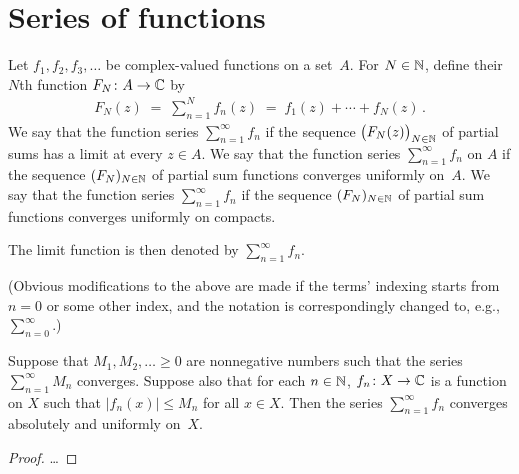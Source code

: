 \section{Series of functions}

\begin{definition}
  \label{def:function_series}
  Let $f_1, f_2, f_3, \ldots$ be complex-valued functions on a set~$A$.
  For $N \in \mathbb{N}$,
  define their $N$th  function $F_N \colon A \to \mathbb{C}$ by
  \begin{align*}
    F_N(z) \; = \; \sum_{n=1}^N f_n(z) \; = \; f_1(z) + \cdots + f_N(z) \, .
  \end{align*}
  We say that the function series $\sum_{n=1}^\infty f_n$
  if the sequence $\big(F_N(z)\big)_{N \in \mathbb{N}}$ of partial sums has
  a limit at every $z \in A$.
  We say that the function series $\sum_{n=1}^\infty f_n$
   on $A$
  if the sequence $(F_N)_{N \in \mathbb{N}}$ of partial sum functions
  converges uniformly on~$A$.
  We say that the function series $\sum_{n=1}^\infty f_n$
  if the sequence $(F_N)_{N \in \mathbb{N}}$ of partial sum functions
  converges uniformly on compacts.

  The limit function is then denoted by $\sum_{n=1}^\infty f_n$.

  (Obvious modifications to the above are made
  if the terms' indexing starts from $n=0$ or some other index, and
  the notation is correspondingly changed to, e.g., $\sum_{n=0}^\infty$.)
\end{definition}

\begin{lemma}
  \label{lem:weierstrass_test}
  Suppose that $M_1,M_2,\ldots \ge 0$ are nonnegative
  numbers such that the series $\sum_{n=1}^\infty M_n$ converges.
  Suppose also that for each $n \in \mathbb{N}$,
  $f_n \colon X \to \mathbb{C}$ is a function on $X$
  such that $|f_n(x)| \le M_n$ for all $x \in X$.
  Then the series $\sum_{n=1}^\infty f_n$
  converges absolutely and uniformly on~$X$.
\end{lemma}
\begin{proof}
  \ldots
\end{proof}

